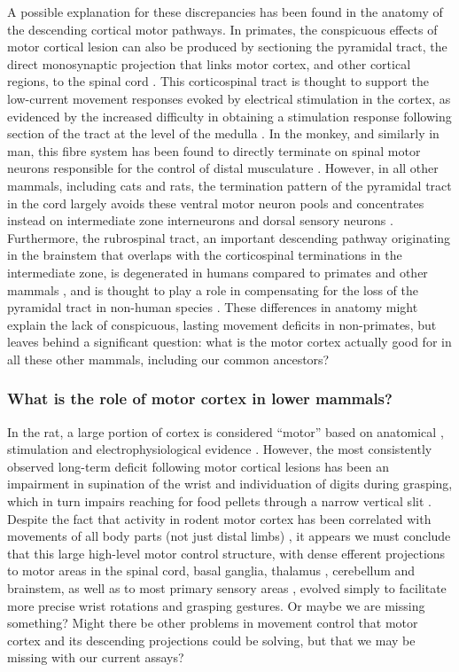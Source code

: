 A possible explanation for these discrepancies has been found in the anatomy of the descending cortical motor pathways. In primates, the conspicuous effects of motor cortical lesion can also be produced by sectioning the pyramidal tract, the direct monosynaptic projection that links motor cortex, and other cortical regions, to the spinal cord \cite{Tower1940,Lawrence1968}. This corticospinal tract is thought to support the low-current movement responses evoked by electrical stimulation in the cortex, as evidenced by the increased difficulty in obtaining a stimulation response following section of the tract at the level of the medulla \cite{Woolsey1972}. In the monkey, and similarly in man, this fibre system has been found to directly terminate on spinal motor neurons responsible for the control of distal musculature \cite{Leyton1917,Bernhard1954}. However, in all other mammals, including cats and rats, the termination pattern of the pyramidal tract in the cord largely avoids these ventral motor neuron pools and concentrates instead on intermediate zone interneurons and dorsal sensory neurons \cite{Kuypers1981,Yang2003}. Furthermore, the rubrospinal tract, an important descending pathway originating in the brainstem that overlaps with the corticospinal terminations in the intermediate zone, is degenerated in humans compared to primates and other mammals \cite{Square1982}, and is thought to play a role in compensating for the loss of the pyramidal tract in non-human species \cite{Lawrence1968a,Zaaimi2012}. These differences in anatomy might explain the lack of conspicuous, lasting movement deficits in non-primates, but leaves behind a significant question: what is the motor cortex actually good for in all these other mammals, including our common ancestors?

\subsubsection*{What is the role of motor cortex in lower mammals?}

In the rat, a large portion of cortex is considered ``motor'' based on anatomical \cite{Donoghue1982}, stimulation \cite{Donoghue1982,Neafsey1986} and electrophysiological evidence \cite{Hyland1998}. However, the most consistently observed long-term deficit following motor cortical lesions has been an impairment in supination of the wrist and individuation of digits during grasping, which in turn impairs reaching for food pellets through a narrow vertical slit \cite{Alaverdashvili2008a}. Despite the fact that activity in rodent motor cortex has been correlated with movements of all body parts (not just distal limbs) \cite{Hill2011,Erlich2011}, it appears we must conclude that this large high-level motor control structure, with dense efferent projections to motor areas in the spinal cord, basal ganglia, thalamus \cite{Lee2008}, cerebellum and brainstem, as well as to most primary sensory areas \cite{Petreanu2012,Schneider2014}, evolved simply to facilitate more precise wrist rotations and grasping gestures. Or maybe we are missing something? Might there be other problems in movement control that motor cortex and its descending projections could be solving, but that we may be missing with our current assays?

